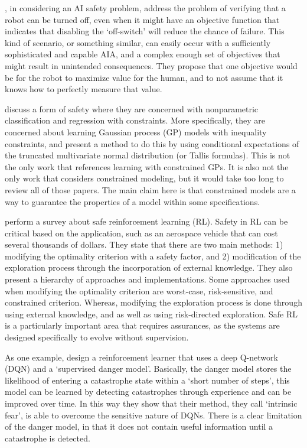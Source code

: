     \citet{Hadfield-Menell2016-ws}, in considering an AI safety problem, address the problem of verifying that a robot can be turned off, even when it might have an objective function that indicates that disabling the `off-switch' will reduce the chance of failure. This kind of scenario, or something similar, can easily occur with a sufficiently sophisticated and capable AIA, and a complex enough set of objectives that might result in unintended consequences. They propose that one objective would be for the robot to maximize value for the human, and to not assume that it knows how to perfectly measure that value. 

    \citet{Da_Veiga2012-gh} discuss a form of safety where they are concerned with nonparametric classification and regression with constraints. More specifically, they are concerned about learning Gaussian process (GP) models with inequality constraints, and present a method to do this by using conditional expectations of the truncated multivariate normal distribution (or Tallis formulas). This is not the only work that references learning with constrained GPs. It is also not the only work that considers constrained modeling, but it would take too long to review all of those papers. The main claim here is that constrained models are a way to guarantee the properties of a model within some specifications.

    \citet{Garcia2015-rs} perform a survey about safe reinforcement learning (RL). Safety in RL can be critical based on the application, such as an aerospace vehicle that can cost several thousands of dollars. They state that there are two main methods: 1) modifying the optimality criterion with a safety factor, and 2) modification of the exploration process through the incorporation of external knowledge. They also present a hierarchy of approaches and implementations. Some approaches used when modifying the optimality criterion are worst-case, risk-sensitive, and constrained criterion. Whereas, modifying the exploration process is done through using external knowledge, and as well as using risk-directed exploration. Safe RL is a particularly important area that requires assurances, as the systems are designed specifically to evolve without supervision.

    As one example, \citet{Lipton2016-dq} design a reinforcement learner that uses a deep Q-network (DQN) and a `supervised danger model'. Basically, the danger model stores the likelihood of entering a catastrophe state within a `short number of steps', this model can be learned by detecting catastrophes through experience and can be improved over time.  In this way they show that their method, they call `intrinsic fear', is able to overcome the sensitive nature of DQNs. There is a clear limitation of the danger model, in that it does not contain useful information until a catastrophe is detected. 

